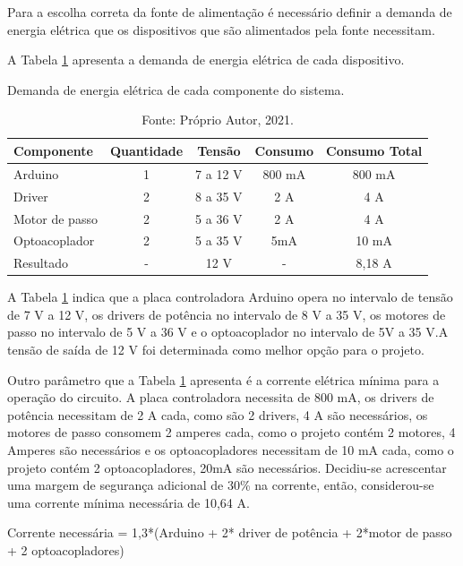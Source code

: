 Para a escolha correta da fonte de alimentação é necessário definir a demanda de energia elétrica 
que os dispositivos que são alimentados pela fonte necessitam.

A Tabela \ref{tab:demandafonte} apresenta a demanda de energia elétrica de cada dispositivo.

\begin{table}
    \centering
    \caption{Demanda de energia elétrica de cada componente do sistema.}
    \begin{tabular}{lcccc}
        \hline
        \textbf{Componente} & \textbf{Quantidade} & \textbf{Tensão} & \textbf{Consumo} & \textbf{Consumo Total}\\
        \hline
        Arduino & 1 & 7 a 12 V & 800 mA & 800 mA\\
        Driver & 2 & 8 a 35 V & 2 A & 4 A\\
        Motor de passo & 2 & 5 a 36 V & 2 A & 4 A\\
        Optoacoplador & 2 & 5 a 35 V & 5mA & 10 mA\\
        Resultado & - & 12 V & - & 8,18 A\\
        \hline       
    \end{tabular}
    \caption*{Fonte: Próprio Autor, 2021.}
    \label{tab:demandafonte}
\end{table}

A Tabela \ref{tab:demandafonte} indica que a placa controladora Arduino opera no intervalo de tensão de 7 V a 12 V, 
os drivers de potência no intervalo de 8 V a 35 V, os motores de passo no intervalo de 5 V a 36 V 
e o optoacoplador no intervalo de 5V a 35 V.A tensão de saída de 12 V foi determinada como melhor 
opção para o projeto.

Outro parâmetro que a Tabela \ref{tab:demandafonte} apresenta é a corrente elétrica mínima para a operação do circuito. 
A placa controladora necessita de 800 mA, os drivers de potência necessitam de 2 A cada, como são 2 drivers, 
4 A são necessários, os motores de passo consomem 2 amperes cada, como o projeto contém 2 motores, 4 Amperes 
são necessários e os optoacopladores necessitam de 10 mA cada, como o projeto contém 2 optoacopladores, 
20mA são necessários. Decidiu-se acrescentar uma margem de segurança adicional de 30\% na corrente, 
então, considerou-se uma corrente mínima necessária de 10,64 A.

Corrente necessária = 1,3*(Arduino + 2* driver de potência + 2*motor de passo + 2 optoacopladores)

